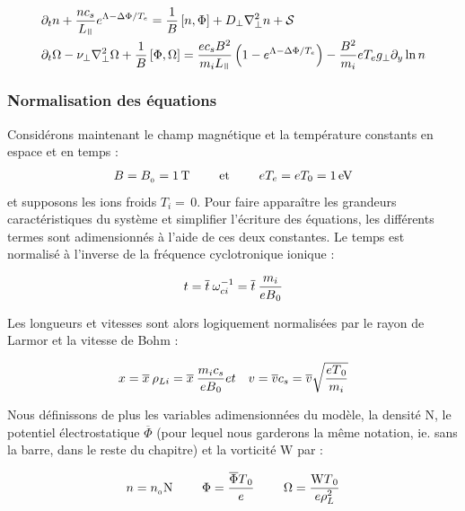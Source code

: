 \begin{refsection}
\begin{align}
\label{2-eqContinuiteMoyenne}
&\partial_t n + \frac{nc_s}{L_\para}e^{\Lambda-\Delta \Phi/T_e} =
\frac{1}{B}\left[n,\Phi\right] + D_\perp\nabla^2_\perp n + \mathcal{S}\\
&\partial_{t}\Omega - \nu_\perp
\nabla_\perp^2\Omega+
\frac{1}{B}\left[\Phi,\Omega\right]=\frac{ec_sB^2}{m_iL_\para}\left(1-e^{\Lambda-\Delta
\Phi/T_e}\right) -\frac{B^2}{m_i}eT_eg_\perp\partial_y\ln n
\label{2-eqCourantMoyenne}
\end{align}
 
\subsubsection{Normalisation des équations}

Considérons maintenant le champ magnétique et la température constants en espace
et en temps :
\begin{equation}
B=B_{{_{0}}}=1\,\text{T~~~~~~~et~~~~~~~}eT_e=eT_0=1\,\text{eV}
\end{equation}
et supposons les
ions froids $T_i=\,$0.
Pour faire apparaître les grandeurs caractéristiques du système et simplifier
l'écriture des équations, les différents termes sont adimensionnés à
l'aide de ces deux constantes. Le temps est normalisé à l'inverse de la
fréquence cyclotronique ionique :

\begin{equation}
t = \overline{t}\:\omega_{ci}^{{-1}} =
\overline{t}\:\frac{m_i}{eB{_{0}}}
\end{equation}

Les longueurs et vitesses sont alors logiquement normalisées par le rayon de
Larmor et la vitesse de Bohm :

\begin{eqnarray}
x = \overline{x}\:\rho_{Li} =
\overline{x}\:\frac{m_ic_s}{eB{_{0}}} &
et &
v=\overline{v}c_s=\overline{v}\sqrt{\frac{eT{_{0}}}{m_i}}
\end{eqnarray}

Nous définissons de plus les variables adimensionnées du modèle, la densité
$\text{N}$, le potentiel électrostatique $\overline{\Phi}$ (pour lequel nous
garderons la même notation, ie. sans la barre, dans le reste du chapitre) et la
vorticité $\text{W}$ par :

\begin{eqnarray}
n = n_{{_{0}}}\text{N} \text{~~~~~~~} \Phi=\frac{\overline{\Phi}
T{_{0}}}{e}
\text{~~~~~~~} \Omega=\frac{\text{W} T{_{0}}}{e\rho_L^2}
\end{eqnarray}


\end{refsection}
